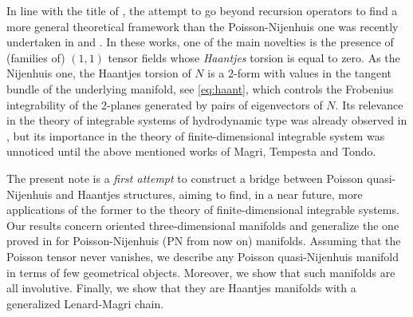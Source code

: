 \documentclass[12pt]{article}
\begin{document}
In line with the title of \cite{Kos-Recursion}, the attempt to go beyond recursion operators to find a more general theoretical framework than the Poisson-Nijenhuis one %
was recently undertaken in \cite{MagriHaa, MagriVeselov, MagriSymm} and \cite{tempestatondoben, tempestatondo, tempestatondohigher,tempestatondoclass}. In these works, one of the main novelties is the presence of (families of) $(1,1)$ tensor fields whose \emph{Haantjes} torsion is equal to zero. 
As the Nijenhuis one, the Haantjes torsion of  $N$ is a 2-form with values in the tangent bundle of the underlying manifold, see  \eqref{eq:haant}, which controls the Frobenius integrability of the 2-planes generated by pairs of eigenvectors of $N$. 
Its relevance in the theory of integrable systems of hydrodynamic type was already observed in 
\cite{Bogo96-182,FeraMar}, but its importance in the theory of finite-dimensional integrable system was unnoticed until the above mentioned works of Magri, Tempesta and Tondo.

The present note is a \emph{first attempt} to construct a bridge between Poisson quasi-Nijenhuis and Haantjes structures, aiming to find, in a near future, more applications of the former to the theory of finite-dimensional integrable systems.
Our results concern oriented three-dimensional manifolds and generalize the one proved in \cite{Cheng-Sheng} for Poisson-Nijenhuis (PN from now on) manifolds. Assuming that the Poisson tensor never vanishes, we describe any Poisson quasi-Nijenhuis manifold in terms of few geometrical objects. Moreover, we show that such manifolds are all involutive. Finally, we show that they are Haantjes manifolds with a generalized Lenard-Magri chain.
\end{document}
